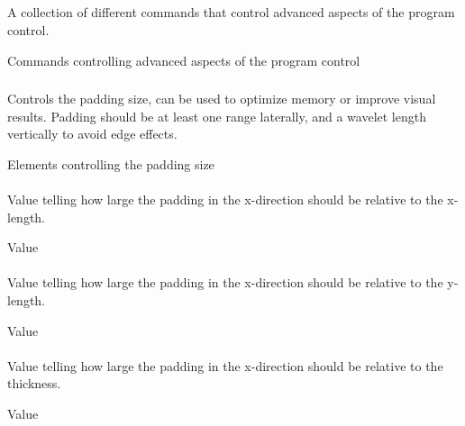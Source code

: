\subsection{} 
 \slist
   \item \Description A collection of different commands that control advanced aspects of the program control.
   \item \Argument Commands controlling advanced aspects of the program control
   \item \Default
 \elist

\subsubsection{}
 \slist
   \item \Description Controls the padding size, can be used to optimize memory or improve visual results. Padding should be at least one range laterally, and a wavelet length vertically to avoid edge effects.
   \item \Argument Elements controlling the padding size
   \item \Default
 \elist

\paragraph{}
 \slist
   \item \Description Value telling how large the padding in the x-direction should be relative to the x-length. %
   \item \Argument Value
   \item {}
 \elist

\paragraph{}
 \slist
   \item \Description Value telling how large the padding in the x-direction should be relative to the y-length.
   \item \Argument Value
   \item {}
 \elist

\paragraph{}
 \slist
   \item \Description Value telling how large the padding in the x-direction should be relative to the thickness.
   \item \Argument Value
   \item {}
 \elist

